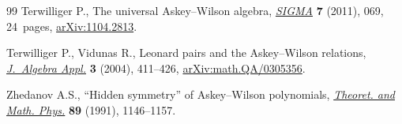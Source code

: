\begin{thebibliography}{99}
Terwilliger P., The universal {A}skey--{W}ilson algebra, \href{https://doi.org/10.3842/SIGMA.2011.069}{\textit{SIGMA}}
 \textbf{7} (2011), 069, 24~pages, \href{https://arxiv.org/abs/1104.2813}{arXiv:1104.2813}.

Terwilliger P., Vidunas R., Leonard pairs and the {A}skey--{W}ilson relations,
 \href{https://doi.org/10.1142/S0219498804000940}{\textit{J.~Algebra Appl.}} \textbf{3} (2004), 411--426, \href{https://arxiv.org/abs/math.QA/0305356}{arXiv:math.QA/0305356}.

Zhedanov A.S., ``{H}idden symmetry'' of {A}skey--{W}ilson polynomials,
 \href{https://doi.org/10.1007/BF01015906}{\textit{Theoret. and Math. Phys.}} \textbf{89} (1991), 1146--1157.

\end{thebibliography}
